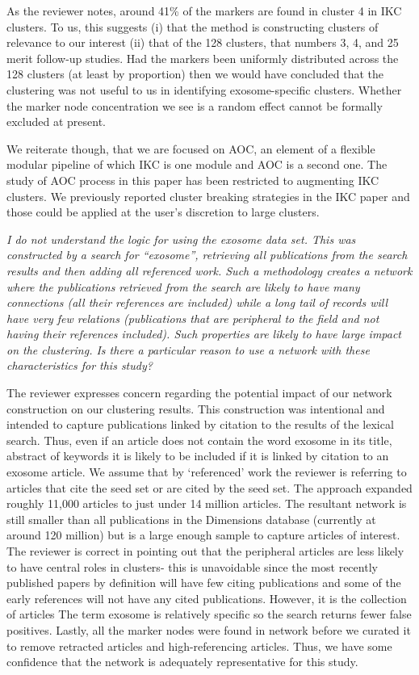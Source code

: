 \documentclass[11pt, oneside]{article}   	%
\begin{document}
As the reviewer notes, around 41\% of the markers are found in cluster 4 in IKC clusters. To us, this suggests (i) that the method is constructing clusters of relevance to our interest
(ii) that of the 128 clusters, that numbers 3, 4, and 25 merit follow-up studies. Had the markers been uniformly distributed across the 128 clusters (at least by proportion) then we
would have concluded that the clustering was not useful to us in identifying exosome-specific clusters. Whether the marker node concentration we see is a random effect cannot be formally excluded at present.

We reiterate though, that we are focused on AOC, an element of a flexible modular pipeline of which IKC is one module and AOC is a second one. The study of AOC process in this paper has been restricted 
to augmenting IKC clusters. We previously reported cluster breaking strategies in the IKC paper and those could be applied at the user's discretion to large clusters.

\emph{I do not understand the logic for using the exosome data set. This was constructed by a search for “exosome”, retrieving all publications from the search results and then adding all referenced work. Such a methodology creates a network where the publications retrieved from the search are likely to have many connections (all their references are included) while a long tail of records will have very few relations (publications that are peripheral to the field and not having their references included). Such properties are likely to have large impact on the clustering. Is there a particular reason to use a network with these characteristics for this study?}

The reviewer expresses concern regarding the potential impact of our network construction on our clustering results.  This construction was intentional and intended to capture publications linked by citation to the results of the lexical search. Thus, even if an article does not contain the word exosome in its title, abstract of keywords it is likely to be included if it is linked by citation to an exosome article. We assume that by `referenced' work the reviewer is referring to articles that cite the seed set or are cited by the seed set. The approach expanded roughly 11,000 articles to just under 14 million articles. The resultant network is still smaller than all publications in the Dimensions database (currently at around 120 million) but is a large enough sample to capture articles of interest. The reviewer is correct in pointing out that the peripheral articles are less likely to have central roles in clusters- this is unavoidable since the most recently published papers by definition will have few citing publications and some of the early references will not have any cited publications. However, it is the collection of articles The term exosome is relatively specific so the search returns fewer false positives. Lastly, all the marker nodes were found in network before we curated it to remove retracted articles and high-referencing articles. Thus, we have some confidence that the network is adequately representative for this study.  
\end{document}
